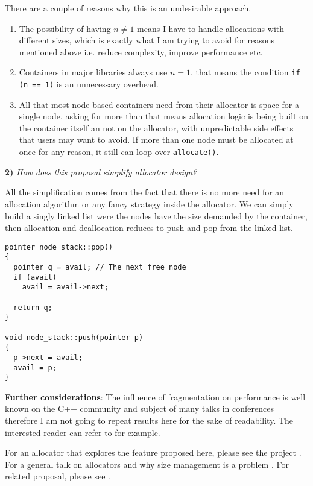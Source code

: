 \documentclass[11pt]{article}
\begin{document}
\noindent
There are a couple of reasons why this is an undesirable approach.

\begin{enumerate}
\item The possibility of having $n \ne 1$ means I have to handle
allocations with different sizes, which is exactly what I am
trying to avoid for reasons mentioned above i.e. reduce
complexity, improve performance etc.

\item Containers in major libraries always use $n = 1$, that
means the condition \texttt{if (n == 1)} is an unnecessary
overhead.

\item All that most node-based containers need from their allocator
is space for a single node, asking for more than that means
allocation logic is being built on the container itself an not on
the allocator, with unpredictable side effects that users may
want to avoid. If more than one node must be allocated at once for any
reason, it still can loop over \texttt{allocate()}.
\end{enumerate}

\medskip
\noindent
{\bf 2) }{\it How does this proposal simplify allocator design?}

\medskip
\noindent
All the simplification comes from the fact that there is no more
need for an allocation algorithm or any fancy strategy inside the
allocator. We can simply build a singly linked list were the
nodes have the size demanded by the container, then allocation
and deallocation reduces to push and pop from the linked list.

\medskip
\begin{lstlisting}
pointer node_stack::pop()
{
  pointer q = avail; // The next free node
  if (avail)
    avail = avail->next;

  return q;
}

void node_stack::push(pointer p)
{
  p->next = avail;
  avail = p;
}

\end{lstlisting}

\medskip
\noindent
{\bf Further considerations}: The influence of fragmentation on
performance is well known on the C++ community and subject of many
talks in conferences therefore I am not going to repeat results here
for the sake of readability. The interested reader can refer to
  \cite{chandler, meyers} for example.

For an allocator that explores the feature proposed here, please see
the project \cite{rtcpp}. For a general
talk on allocators and why size management is a problem
\cite{alexandrescu}. For related proposal, please see \cite{prop1}.
\end{document}
